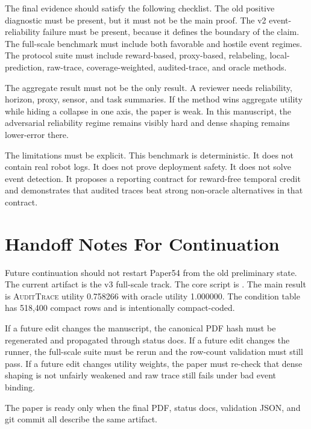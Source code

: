 \documentclass{article}
\newcommand{\method}{\textsc{AuditTrace}\xspace}
\begin{document}
The final evidence should satisfy the following checklist. The old positive diagnostic must be present, but it must not be the main proof. The v2 event-reliability failure must be present, because it defines the boundary of the claim. The full-scale benchmark must include both favorable and hostile event regimes. The protocol suite must include reward-based, proxy-based, relabeling, local-prediction, raw-trace, coverage-weighted, audited-trace, and oracle methods.

The aggregate result must not be the only result. A reviewer needs reliability, horizon, proxy, sensor, and task summaries. If the method wins aggregate utility while hiding a collapse in one axis, the paper is weak. In this manuscript, the adversarial reliability regime remains visibly hard and dense shaping remains lower-error there.

The limitations must be explicit. This benchmark is deterministic. It does not contain real robot logs. It does not prove deployment safety. It does not solve event detection. It proposes a reporting contract for reward-free temporal credit and demonstrates that audited traces beat strong non-oracle alternatives in that contract.

\section{Handoff Notes For Continuation}

Future continuation should not restart Paper54 from the old preliminary state. The current artifact is the v3 full-scale track. The core script is . The main result is \method utility 0.758266 with oracle utility 1.000000. The condition table has 518,400 compact rows and is intentionally compact-coded.

If a future edit changes the manuscript, the canonical PDF hash must be regenerated and propagated through status docs. If a future edit changes the runner, the full-scale suite must be rerun and the row-count validation must still pass. If a future edit changes utility weights, the paper must re-check that dense shaping is not unfairly weakened and raw trace still fails under bad event binding.

The paper is ready only when the final PDF, status docs, validation JSON, and git commit all describe the same artifact.
\end{document}
